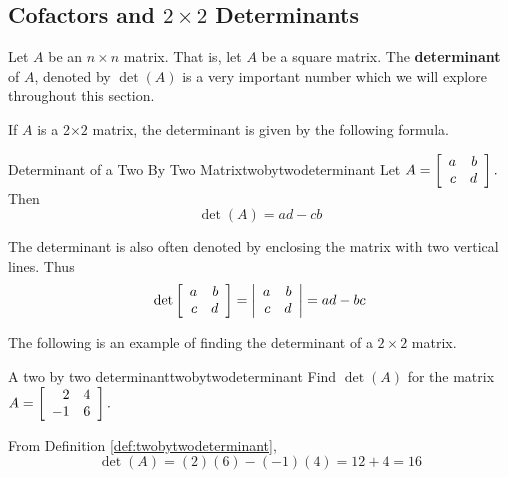\subsection{Cofactors and \texorpdfstring{$2\times 2$}{2x2} Determinants}

Let $A$ be an $n\times n$ matrix. That is, let $A$ be a square matrix. The \textbf{determinant} of $A$, denoted
by $\det \left( A\right) $ is a very important number which we will explore throughout this section. 

If $A$ is a 2$\times 2$
matrix, the determinant is given by the following formula.

\begin{definition}{Determinant of a Two By Two Matrix}{twobytwodeterminant}
Let $A=\left[
\begin{array}{rr}
a & b \\
c & d
\end{array}
\right] .$ Then
\begin{equation*}
\det \left( A\right)  = ad-cb
\end{equation*}
\end{definition}

The determinant is also often denoted by enclosing the matrix with two
vertical lines. Thus
\begin{equation*}
\det \left[
\begin{array}{rr}
a & b \\
c & d
\end{array}
\right] =\left|
\begin{array}{rr}
a & b \\
c & d
\end{array}
\right| 
=ad - bc
\end{equation*}

The following is an example of finding the determinant of a $2 \times 2$ matrix.

\begin{example}{A two by two determinant}{twobytwodeterminant}
Find $\det\left(A\right) $ for the matrix
$A =  \left[
\begin{array}{rr}
2 & 4 \\
-1 & 6
\end{array}
\right] .$
\end{example}

\begin{solution} From Definition \ref{def:twobytwodeterminant},
\begin{equation*}
\det \left( A\right) = \left( 2\right) \left( 6\right) -\left(
-1\right) \left( 4\right) = 12 + 4 = 16
\end{equation*}
\end{solution} 

